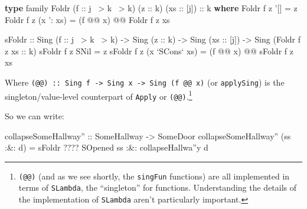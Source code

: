 \documentclass[]{article}
\newenvironment{Shaded}{}{}
\newcommand{\DataTypeTok}[1]{\textcolor[rgb]{0.56,0.13,0.00}{#1}}
\newcommand{\FunctionTok}[1]{\textcolor[rgb]{0.02,0.16,0.49}{#1}}
\newcommand{\KeywordTok}[1]{\textcolor[rgb]{0.00,0.44,0.13}{\textbf{#1}}}
\newcommand{\NormalTok}[1]{#1}
\newcommand{\OtherTok}[1]{\textcolor[rgb]{0.00,0.44,0.13}{#1}}
\begin{document}
\begin{Shaded}
\begin{Highlighting}[]
\KeywordTok{type}\NormalTok{ family }\DataTypeTok{Foldr}\NormalTok{ (}\OtherTok{f ::}\NormalTok{ j }\FunctionTok{~>}\NormalTok{ k }\FunctionTok{~>}\NormalTok{ k) (}\OtherTok{z ::}\NormalTok{ k) (}\OtherTok{xs ::}\NormalTok{ [j])}\OtherTok{ ::}\NormalTok{ k }\KeywordTok{where}
    \DataTypeTok{Foldr}\NormalTok{ f z '[]       }\FunctionTok{=}\NormalTok{ z}
    \DataTypeTok{Foldr}\NormalTok{ f z (x '}\FunctionTok{:}\NormalTok{ xs) }\FunctionTok{=}\NormalTok{ (f }\FunctionTok{@@}\NormalTok{ x) }\FunctionTok{@@} \DataTypeTok{Foldr}\NormalTok{ f z xs}

\NormalTok{sFoldr}
\OtherTok{    ::} \DataTypeTok{Sing}\NormalTok{ (}\OtherTok{f ::}\NormalTok{ j }\FunctionTok{~>}\NormalTok{ k }\FunctionTok{~>}\NormalTok{ k)}
    \OtherTok{->} \DataTypeTok{Sing}\NormalTok{ (}\OtherTok{z ::}\NormalTok{ k)}
    \OtherTok{->} \DataTypeTok{Sing}\NormalTok{ (}\OtherTok{xs ::}\NormalTok{ [j])}
    \OtherTok{->} \DataTypeTok{Sing}\NormalTok{ (}\DataTypeTok{Foldr}\NormalTok{ f z}\OtherTok{ xs ::}\NormalTok{ k)}
\NormalTok{sFoldr f z }\DataTypeTok{SNil}           \FunctionTok{=}\NormalTok{ z}
\NormalTok{sFoldr f z (x }\OtherTok{`SCons`}\NormalTok{ xs) }\FunctionTok{=}\NormalTok{ (f }\FunctionTok{@@}\NormalTok{ x) }\FunctionTok{@@}\NormalTok{ sFoldr f z xs}
\end{Highlighting}
\end{Shaded}

Where
\texttt{(@@)\ ::\ Sing\ f\ -\textgreater{}\ Sing\ x\ -\textgreater{}\ Sing\ (f\ @@\ x)}
(or \texttt{applySing}) is the singleton/value-level counterpart of
\texttt{Apply} or \texttt{(@@)}.\footnote{\texttt{(@@)} (and as we see shortly,
  the \texttt{singFun} functions) are all implemented in terms of
  \texttt{SLambda}, the ``singleton'' for functions. Understanding the details
  of the implementation of \texttt{SLambda} aren't particularly important.}

So we can write:

\begin{Shaded}
\begin{Highlighting}[]
\OtherTok{collapseSomeHallway'' ::} \DataTypeTok{SomeHallway} \OtherTok{->} \DataTypeTok{SomeDoor}
\NormalTok{collapseSomeHallway'' (ss }\FunctionTok{:&:}\NormalTok{ d) }\FunctionTok{=}\NormalTok{ sFoldr }\FunctionTok{????} \DataTypeTok{SOpened}\NormalTok{ ss}
                               \FunctionTok{:&:}\NormalTok{ collapseHallwa''y d}
\end{Highlighting}
\end{Shaded}
\end{document}
